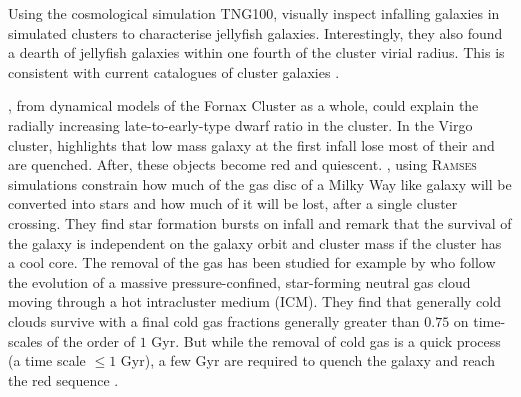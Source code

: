 Using the cosmological simulation TNG100, \citet{Yun2018} visually inspect infalling galaxies in simulated clusters to characterise jellyfish galaxies.
Interestingly, they also found a dearth of jellyfish galaxies within one fourth of the cluster virial radius.
This is consistent with current catalogues of cluster galaxies \citep{Lisker2006, Venhola2019}.


\citet{DeRijcke2010}, from dynamical models of the Fornax Cluster as a whole, could explain the radially increasing late-to-early-type dwarf ratio in the cluster.
In the Virgo cluster, \citet{Boselli2008} highlights that low mass galaxy at the first infall lose most of their \Hi{} and are quenched.
After, these objects become red and quiescent.
\citet{Ruggiero2017}, using \textsc{Ramses} simulations constrain how much of the gas disc of a Milky Way like galaxy will be converted into stars and how much of it will be lost, after a single cluster crossing.
They find star formation bursts on infall and remark that the survival of the galaxy is independent on the galaxy orbit and cluster mass if the cluster has a cool core.
The removal of the gas has been studied for example by \cite{Calura2020} who follow the evolution of a massive pressure-confined, star-forming neutral gas cloud moving through a hot intracluster medium (ICM).
They find that generally cold clouds survive with a final cold gas fractions generally greater than $0.75$ on time-scales of the order of $1$ Gyr.
But while the removal of cold gas is a quick process (a time scale $\leq1$ Gyr), a few Gyr are required to quench the galaxy and reach the red sequence \citep{Cortese2009}.


